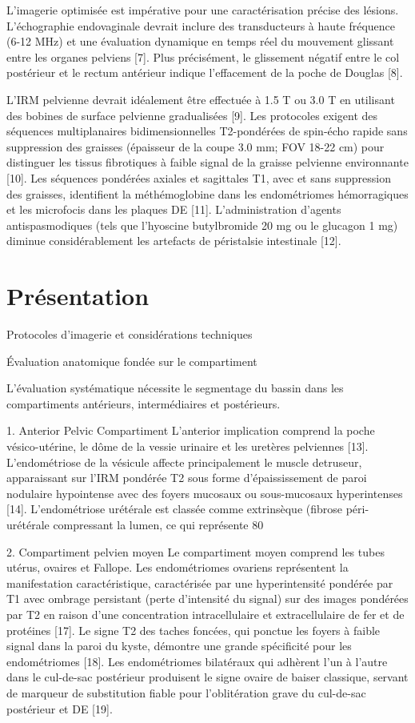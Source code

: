 \documentclass[11pt,a4paper]{article}
\begin{document}
L'imagerie optimisée est impérative pour une caractérisation précise des lésions. L'échographie endovaginale devrait inclure des transducteurs à haute fréquence (6-12 MHz) et une évaluation dynamique en temps réel du mouvement glissant entre les organes pelviens [7]. Plus précisément, le glissement négatif entre le col postérieur et le rectum antérieur indique l'effacement de la poche de Douglas [8].

L'IRM pelvienne devrait idéalement être effectuée à 1.5 T ou 3.0 T en utilisant des bobines de surface pelvienne gradualisées [9]. Les protocoles exigent des séquences multiplanaires bidimensionnelles T2-pondérées de spin-écho rapide sans suppression des graisses (épaisseur de la coupe 3.0 mm; FOV 18-22 cm) pour distinguer les tissus fibrotiques à faible signal de la graisse pelvienne environnante [10]. Les séquences pondérées axiales et sagittales T1, avec et sans suppression des graisses, identifient la méthémoglobine dans les endométriomes hémorragiques et les microfocis dans les plaques DE [11]. L'administration d'agents antispasmodiques (tels que l'hyoscine butylbromide 20 mg ou le glucagon 1 mg) diminue considérablement les artefacts de péristalsie intestinale [12].

\section{Présentation}
Protocoles d'imagerie et considérations techniques

Évaluation anatomique fondée sur le compartiment

L'évaluation systématique nécessite le segmentage du bassin dans les compartiments antérieurs, intermédiaires et postérieurs.

1. Anterior Pelvic Compartiment L'anterior implication comprend la poche vésico-utérine, le dôme de la vessie urinaire et les uretères pelviennes [13]. L'endométriose de la vésicule affecte principalement le muscle detruseur, apparaissant sur l'IRM pondérée T2 sous forme d'épaississement de paroi nodulaire hypointense avec des foyers mucosaux ou sous-mucosaux hyperintenses [14]. L'endométriose urétérale est classée comme extrinsèque (fibrose péri-urétérale compressant la lumen, ce qui représente 80%

2. Compartiment pelvien moyen Le compartiment moyen comprend les tubes utérus, ovaires et Fallope. Les endométriomes ovariens représentent la manifestation caractéristique, caractérisée par une hyperintensité pondérée par T1 avec ombrage persistant (perte d'intensité du signal) sur des images pondérées par T2 en raison d'une concentration intracellulaire et extracellulaire de fer et de protéines [17]. Le signe T2 des taches foncées, qui ponctue les foyers à faible signal dans la paroi du kyste, démontre une grande spécificité pour les endométriomes [18]. Les endométriomes bilatéraux qui adhèrent l'un à l'autre dans le cul-de-sac postérieur produisent le signe ovaire de baiser classique, servant de marqueur de substitution fiable pour l'oblitération grave du cul-de-sac postérieur et DE [19].
\end{document}
